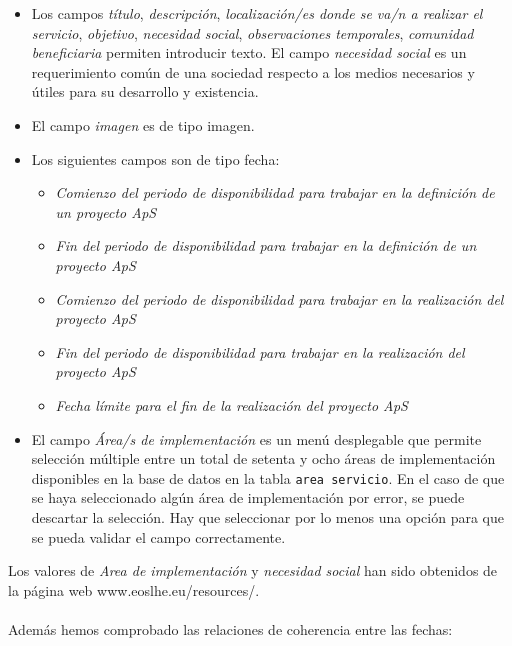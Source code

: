 \documentclass[11pt]{book}
\begin{document}
 \begin{itemize} 
 	\item Los campos \emph{título}, \emph{descripción}, \emph{localización/es donde se va/n a realizar el servicio}, \emph{objetivo}, \emph{necesidad social}, \emph{observaciones temporales}, \emph{comunidad beneficiaria} permiten introducir texto. El campo \emph{necesidad social} es un requerimiento común de una sociedad respecto a los medios necesarios y útiles para su desarrollo y existencia.
 	\item El campo \emph{imagen} es de tipo imagen.
 	\item Los siguientes campos son de tipo fecha: 
 	\begin{itemize} 
 		\item  \emph{Comienzo del periodo de disponibilidad para trabajar en la definición
 			de un proyecto ApS}
 		\item  \emph{Fin del periodo de disponibilidad para trabajar en la definición de un
 			proyecto ApS} 
 		\item  \emph{Comienzo del periodo de disponibilidad para trabajar en la realización
 			del proyecto ApS}
 		\item  \emph{Fin del periodo de disponibilidad para trabajar en la realización del
 			proyecto ApS} 
 		\item  \emph{Fecha límite para el fin de la realización del proyecto ApS}
 	\end{itemize}
 	
 	\item El campo \emph{Área/s de implementación} es un menú desplegable que permite selección múltiple entre un total de setenta y ocho áreas de implementación disponibles en la base de datos en la tabla  \texttt{area servicio}. En el caso de que se haya seleccionado algún área de implementación por error, se puede descartar la selección. Hay que seleccionar por lo menos una opción para que se pueda validar el campo correctamente.
 \end{itemize}
Los valores de \emph{Area de implementación} y \emph{necesidad social} han sido obtenidos de la página web www.eoslhe.eu/resources/.\\\\
 Además hemos comprobado las relaciones de coherencia entre las fechas:
\end{document}

